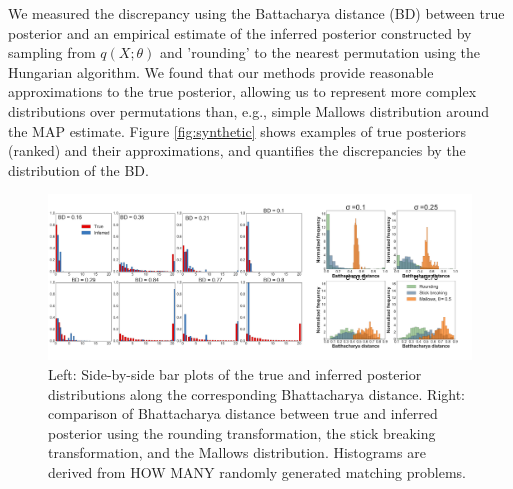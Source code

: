  We measured the discrepancy using the Battacharya distance (BD)
 between true posterior and an empirical estimate of the inferred
 posterior constructed by sampling from $q(X; \theta)$ and 'rounding'
 to the nearest permutation using the Hungarian algorithm. We found
 that our methods provide reasonable approximations to the true
 posterior, allowing us to represent more complex distributions over
 permutations than, e.g., simple Mallows distribution around the MAP
 estimate. Figure \ref{fig:synthetic} shows
 examples of true posteriors (ranked) and their approximations, and
 quantifies the discrepancies by the distribution of the BD.

 \begin{figure}[t] 
   \centering
   \includegraphics[width=1.0\textwidth]{../figures/figure5.pdf}
   \caption{Left: Side-by-side bar plots of the true and inferred
     posterior distributions along the corresponding Bhattacharya distance.
     Right: comparison of Bhattacharya distance between true and inferred
   posterior using the rounding transformation, the stick breaking transformation, and the Mallows distribution.  Histograms are derived from HOW MANY randomly generated matching problems.  }
\label{fig:VAE}
\end{figure}

\label{sec:synthetic}


